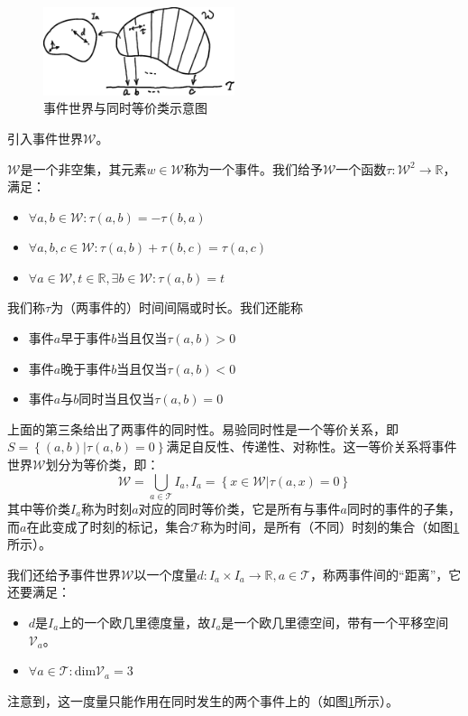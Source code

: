\documentclass[main.tex]{subfiles}
\begin{document}
\begin{figure}[h]
\centering
\includegraphics[width=0.5\textwidth]{images/III.1.2.eps}
\caption{事件世界与同时等价类示意图}
\label{fig:III.1.2}
\end{figure}

引入事件世界$\mathcal{W}$。

\begin{definition}[事件世界、时间]
$\mathcal{W}$是一个非空集，其元素$w\in\mathcal{W}$称为一个事件。我们给予$\mathcal{W}$一个函数$\tau:\mathcal{W}^2\rightarrow\mathbb{R}$，满足：
\begin{itemize}
    \item $\forall a,b\in\mathcal{W}:\tau\left(a,b\right)=-\tau\left(b,a\right)$
    \item $\forall a,b,c\in\mathcal{W}:\tau\left(a,b\right)+\tau\left(b,c\right)=\tau\left(a,c\right)$
    \item $\forall a\in\mathcal{W},t\in\mathbb{R},\exists b\in\mathcal{W}:\tau\left(a,b\right)=t$
\end{itemize}
我们称$\tau$为（两事件的）时间间隔或时长。我们还能称
\begin{itemize}
    \item 事件$a$早于事件$b$当且仅当$\tau\left(a,b\right)>0$
    \item 事件$a$晚于事件$b$当且仅当$\tau\left(a,b\right)<0$
    \item 事件$a$与$b$同时当且仅当$\tau\left(a,b\right)=0$
\end{itemize}
上面的第三条给出了两事件的同时性。易验同时性是一个等价关系，即$S=\left\{\left(a,b\right)|\tau\left(a,b\right)=0\right\}$满足自反性、传递性、对称性。这一等价关系将事件世界$\mathcal{W}$划分为等价类，即：
\[\mathcal{W}=\bigcup_{a\in\mathcal{T}}I_a,I_a=\left\{x\in\mathcal{W}|\tau\left(a,x\right)=0\right\}\]
其中等价类$I_a$称为时刻$a$对应的同时等价类，它是所有与事件$a$同时的事件的子集，而$a$在此变成了时刻的标记，集合$\mathcal{T}$称为时间，是所有（不同）时刻的集合（如图\ref{fig:III.1.2}所示）。

我们还给予事件世界$\mathcal{W}$以一个度量$d:I_a\times I_a\rightarrow\mathbb{R},a\in\mathcal{T}$，称两事件间的“距离”，它还要满足：
\begin{itemize}
    \item $d$是$I_a$上的一个欧几里德度量，故$I_a$是一个欧几里德空间，带有一个平移空间$\mathcal{V}_a$。
    \item $\forall a\in\mathcal{T}:\mathrm{dim}\mathcal{V}_a=3$
\end{itemize}
注意到，这一度量只能作用在同时发生的两个事件上的（如图\ref{fig:III.1.2}所示）。
\end{definition}
\end{document}
